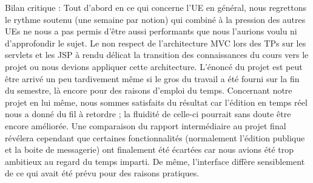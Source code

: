 \documentclass[a4paper, 12pt]{article}
\begin{document}
Bilan critique : Tout d'abord en ce qui concerne l'UE en général, nous regrettons le rythme soutenu (une semaine par notion) qui combiné à la pression des autres UEs ne nous a pas permis d'être aussi performants que nous l'aurions voulu ni d'approfondir le sujet. Le non respect de l'architecture MVC lors des TPs sur les servlets et les JSP à rendu délicat la transition des connaissances du cours vers le projet ou nous devions appliquer cette architecture. L'énoncé du projet est peut être arrivé un peu tardivement même si le gros du travail a été fourni sur la fin du semestre, là encore pour des raisons d'emploi du temps.
Concernant notre projet en lui même, nous sommes satisfaits du résultat car l'édition en temps réel nous a donné du fil à retordre ; la fluidité de celle-ci pourrait sans doute être encore améliorée. Une comparaison du rapport intermédiaire au projet final révélera cependant que certaines fonctionnalités (normalement l'édition publique et la boite de messagerie) ont finalement été écartées car nous avions été trop ambitieux au regard du temps imparti. De même, l'interface diffère sensiblement de ce qui avait été prévu pour des raisons pratiques.
\end{document}
